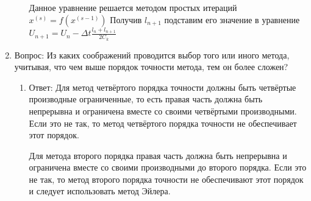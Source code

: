 \documentclass[12pt,a4paper]{scrartcl}
\begin{document}
\begin{enumerate}
\begin{enumerate}
			Данное уравнение решается методом простых итераций $x^{(s)} = f(x^(s-1))$
			Получив $l_{n+1}$ подставим его значение в уравнение $U_{n+1} = U_n - \Delta t \frac{l_n + l_{n + 1}}{2C_k}$
			
		\end{enumerate}
		\item Вопрос: Из каких соображений проводится выбор того или иного метода,
		учитывая, что чем выше порядок точности метода, тем он более сложен? \begin{enumerate}
			\item Ответ: Для метод четвёртого порядка точности должны быть четвёртые производные ограниченные, то есть правая часть должна быть непрерывна и ограничена вместе со своими четвёртыми производными. Если это не так, то метод четвёртого порядка точности не обеспечивает этот порядок.
			
			Для метода второго порядка правая часть должна быть непрерывна и ограничена вместе со своими производными до второго порядка. Если это не так, то метод второго порядка точности не обеспечивают этот порядок и следует использовать метод Эйлера.
			
		\end{enumerate}
	\end{enumerate}
	
\end{document}
